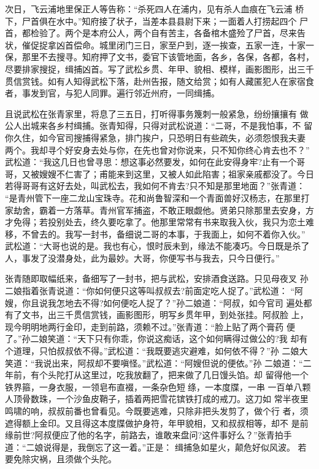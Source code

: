 次日，飞云浦地里保正人等告称：“杀死四人在浦内，见有杀人血痕在飞云浦
桥下，尸首俱在水中。”知府接了状子，当差本县县尉下来；一面着人打捞起四个
尸首，都检验了。两个是本府公人，两个自有苦主，各备棺木盛殓了尸首，尽来告
状，催促捉拿凶首偿命。城里闭门三日，家至户到，逐一挨查，五家一连，十家一
保，那里不去搜寻。知府押了文书，委官下该管地面，各乡，各保，各都，各村，
尽要排家搜捉，缉捕凶首。写了武松乡贯、年甲、貌相、模样，画影图形，出三千
贯信赏钱。如有人知得武松下落，赴州告报，随文给赏；如有人藏匿犯人在家宿食
者，事发到官，与犯人同罪。遍行邻近州府，一同缉捕。

且说武松在张青家里，将息了三五日，打听得事务篾刺一般紧急，纷纷攘攘有
做公人出城来各乡村缉捕。张青知得，只得对武松说道：“二哥，不是我怕事，不
留你久住，如今官司搜捕得紧急，排门挨户，只恐明日有些疏失，必须怨恨我夫妻
两个。我却寻个好安身去处与你，在先也曾对你说来，只不知你终心肯去也不？”
武松道：“我这几日也曾寻思：想这事必然要发，如何在此安得身牢?止有一个哥
哥，又被嫂嫂不仁害了；甫能来到这里，又被人如此陷害；祖家亲戚都没了。今日
若得哥哥有这好去处，叫武松去，我如何不肯去?只不知是那里地面？”张青道：
“是青州管下一座二龙山宝珠寺。花和尚鲁智深和一个青面兽好汉杨志，在那里打
家劫舍，霸着一方落草。青州官军捕盗，不敢正眼觑他。贤弟只除那里去安身，方
才免得；若投别处去，终久要吃拿了。他那里常常有书来取我入伙，我只为恋土难
移，不曾去的。我写一封书，备细说二哥的本事，于我面上，如何不着你入伙。”
武松道：“大哥也说的是。我也有心，恨时辰未到，缘法不能凑巧。今日既是杀了
人，事发了没潜身处，此为最妙。大哥，你便写书与我去，只今日便行。”

张青随即取幅纸来，备细写了一封书，把与武松，安排酒食送路。只见母夜叉
孙二娘指着张青说道：“你如何便只这等叫叔叔去?前面定吃人捉了。”武松道：
“阿嫂，你且说我怎地去不得?如何便吃人捉了？”孙二娘道：“阿叔，如今官司
遍处都有了文书，出三千贯信赏钱，画影图形，明写乡贯年甲，到处张挂。阿叔脸
上，现今明明地两行金印，走到前路，须赖不过。”张青道：“脸上贴了两个膏药
便了。”孙二娘笑道：“天下只有你乖，你说这痴话，这个如何瞒得过做公的?我
却有个道理，只怕叔叔依不得。”武松道：“我既要逃灾避难，如何依不得？”孙
二娘大笑道：“我说出来，阿叔却不要嗔怪。”武松道：“阿嫂但说的便依。”孙
二娘道：“二年前，有个头陀打从这里过，吃我放翻了，把来做了几日馒头馅。却
留得他一个铁界箍，一身衣服，一领皂布直裰，一条杂色短绦，一本度牒，一串
一百单八颗人顶骨数珠，一个沙鱼皮鞘子，插着两把雪花镔铁打成的戒刀。这刀如
常半夜里鸣啸的响，叔叔前番也曾看见。今既要逃难，只除非把头发剪了，做个行
者，须遮得额上金印。又且得这本度牒做护身符，年甲貌相，又和叔叔相等，却不
是前缘前世?阿叔便应了他的名字，前路去，谁敢来盘问?这件事好么？”张青拍手
道：“二娘说得是，我倒忘了这一着。”正是：
缉捕急如星火，颠危好似风波。
若要免除灾祸，且须做个头陀。

